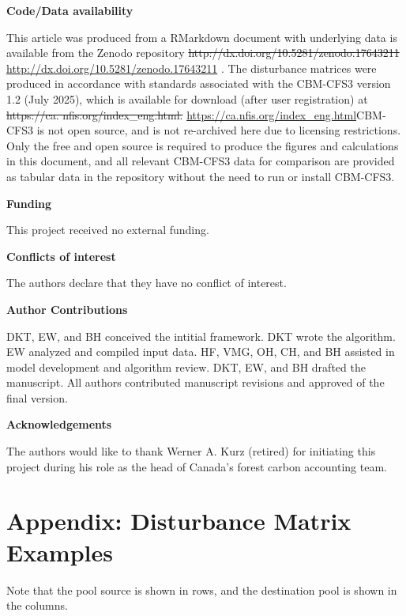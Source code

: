 \documentclass[, manuscript]{copernicus}
\providecommand{\DIFadd}[1]{{\protect\color{blue}\uwave{#1}}} %
\providecommand{\DIFdel}[1]{{\protect\color{red}\sout{#1}}} %
\providecommand{\DIFaddbegin}{} %
\providecommand{\DIFaddend}{} %
\providecommand{\DIFdelbegin}{} %
\providecommand{\DIFdelend}{} %
\begin{document}
\textbf{Code/Data availability}

This article was produced from a RMarkdown document with underlying data
is available from the Zenodo repository
\DIFdelbegin \DIFdel{http://dx.doi.org/10.5281/zenodo.17643211 }\DIFdelend \DIFaddbegin \url{http://dx.doi.org/10.5281/zenodo.17643211} \DIFaddend \citep{thompson2025}.
The disturbance matrices were produced in accordance with standards
associated with the CBM-CFS3 version 1.2 (July 2025), which is available
for download (after user registration) at
\DIFdelbegin \DIFdel{https://ca. nfis.org/index\_eng.html. }\DIFdelend \DIFaddbegin \url{https://ca.nfis.org/index_eng.html}\DIFadd{. }\DIFaddend CBM-CFS3 is not open source,
and is not re-archived here due to licensing restrictions. Only the free
and open source \citet{thompson2025} is required to produce the figures
and calculations in this document, and all relevant CBM-CFS3 data for
comparison are provided as tabular data in the \citet{thompson2025}
repository without the need to run or install CBM-CFS3.

\textbf{Funding}

This project received no external funding.

\textbf{Conflicts of interest}

The authors declare that they have no conflict of interest.

\textbf{Author Contributions}

DKT, EW, and BH conceived the intitial framework. DKT wrote the
algorithm. EW analyzed and compiled input data. HF, VMG, OH, CH, and BH
assisted in model development and algorithm review. DKT, EW, and BH
drafted the manuscript. All authors contributed manuscript revisions and
approved of the final version.

\textbf{Acknowledgements}

The authors would like to thank Werner A. Kurz (retired) for initiating
this project during his role as the head of Canada's forest carbon
accounting team.

\clearpage

\appendixfigures

\appendixtables

\section{Appendix: Disturbance Matrix Examples}

Note that the pool source is shown in rows, and the destination pool is
shown in the columns.
\end{document}
